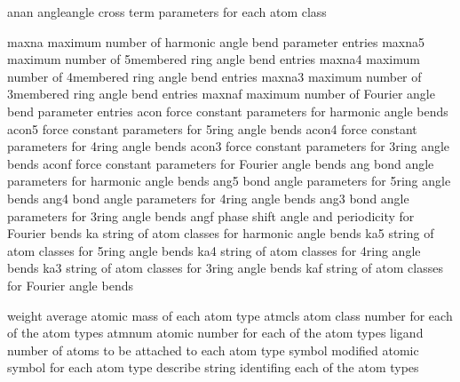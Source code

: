 \documentclass[letterpaper,11pt,english]{sphinxmanual}
\begin{document}

\begin{sphinxVerbatim}[commandchars=\\\{\}]
anan            angle\PYGZhy{}angle cross term parameters for each atom class
\end{sphinxVerbatim}


\begin{sphinxVerbatim}[commandchars=\\\{\}]
maxna           maximum number of harmonic angle bend parameter entries
maxna5          maximum number of 5\PYGZhy{}membered ring angle bend entries
maxna4          maximum number of 4\PYGZhy{}membered ring angle bend entries
maxna3          maximum number of 3\PYGZhy{}membered ring angle bend entries
maxnaf          maximum number of Fourier angle bend parameter entries
acon            force constant parameters for harmonic angle bends
acon5           force constant parameters for 5\PYGZhy{}ring angle bends
acon4           force constant parameters for 4\PYGZhy{}ring angle bends
acon3           force constant parameters for 3\PYGZhy{}ring angle bends
aconf           force constant parameters for Fourier angle bends
ang             bond angle parameters for harmonic angle bends
ang5            bond angle parameters for 5\PYGZhy{}ring angle bends
ang4            bond angle parameters for 4\PYGZhy{}ring angle bends
ang3            bond angle parameters for 3\PYGZhy{}ring angle bends
angf            phase shift angle and periodicity for Fourier bends
ka              string of atom classes for harmonic angle bends
ka5             string of atom classes for 5\PYGZhy{}ring angle bends
ka4             string of atom classes for 4\PYGZhy{}ring angle bends
ka3             string of atom classes for 3\PYGZhy{}ring angle bends
kaf             string of atom classes for Fourier angle bends
\end{sphinxVerbatim}


\begin{sphinxVerbatim}[commandchars=\\\{\}]
weight          average atomic mass of each atom type
atmcls          atom class number for each of the atom types
atmnum          atomic number for each of the atom types
ligand          number of atoms to be attached to each atom type
symbol          modified atomic symbol for each atom type
describe        string identifing each of the atom types
\end{sphinxVerbatim}
\end{document}
